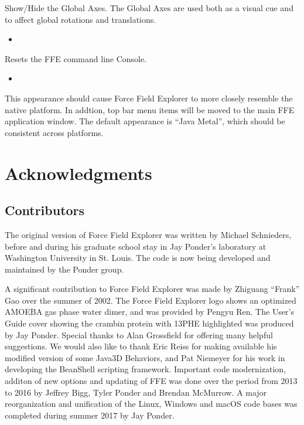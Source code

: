 \documentclass[letterpaper,11pt,english]{sphinxmanual}
\begin{document}
\sphinxAtStartPar
Show/Hide the Global Axes. The Global Axes are used both as a visual cue and to affect global rotations and translations.
\begin{itemize}
\item {} 
\sphinxAtStartPar
{}

\end{itemize}

\sphinxAtStartPar
Resets the FFE command line Console.
\begin{itemize}
\item {} 
\sphinxAtStartPar
{}

\end{itemize}

\sphinxAtStartPar
This appearance should cause Force Field Explorer to more closely resemble the native platform. In addtion, top bar menu items will be moved to the main FFE application window. The default appearance is “Java Metal”, which should be consistent across platforms.

\sphinxstepscope


\chapter{Acknowledgments}
\label{\detokenize{text/acknowledgements:acknowledgments}}\label{\detokenize{text/acknowledgements::doc}}

\section{Contributors}
\label{\detokenize{text/acknowledgements:contributors}}
\sphinxAtStartPar
The original version of Force Field Explorer was written by Michael Schnieders, before and during his graduate school stay in Jay Ponder’s laboratory at Washington University in St. Louis. The code is now being developed and maintained by the Ponder group.

\sphinxAtStartPar
A significant contribution to Force Field Explorer was made by Zhiguang “Frank” Gao over the summer of 2002. The Force Field Explorer logo shows an optimized AMOEBA gas phase water dimer, and was provided by Pengyu Ren. The User’s Guide cover showing the crambin protein with 13\sphinxhyphen{}PHE highlighted was produced by Jay Ponder. Special thanks to Alan Grossfield for offering many helpful suggestions. We would also like to thank Eric Reiss for making available his modified version of some Java3D Behaviors, and Pat Niemeyer for his work in developing the BeanShell scripting framework. Important code modernization, additon of new options and updating of FFE was done over the period from 2013 to 2016 by Jeffrey Bigg, Tyler Ponder and Brendan McMurrow. A major reorganization and unification of the Linux, Windows and macOS code bases was completed during summer 2017 by Jay Ponder.
\end{document}
